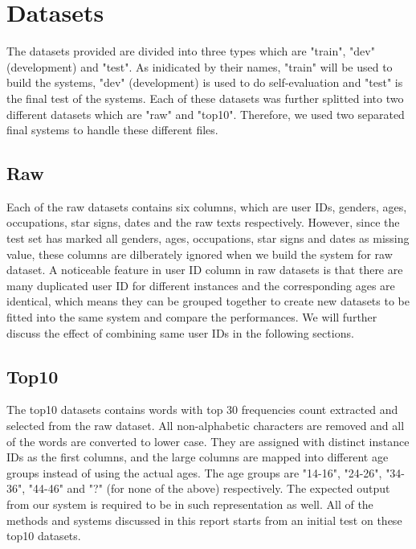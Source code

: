 \documentclass[10pt]{article}
\begin{document}
\section{Datasets}
\justify

The datasets \cite{dataset} provided are divided into three types which are "train", "dev" (development) and "test". As inidicated by their names, "train" will be used to build the systems, "dev" (development) is used to do self-evaluation and "test" is the final test of the systems. Each of these datasets was further splitted into two different datasets which are "raw" and "top10". Therefore, we used two separated final systems to handle these different files.

\subsection{Raw}
\justify

Each of the raw datasets contains six columns, which are user IDs, genders, ages, occupations, star signs, dates and the raw texts respectively. However, since the test set has marked all genders, ages, occupations, star signs and dates as missing value, these columns are dilberately ignored when we build the system for raw dataset. A noticeable feature in user ID column in raw datasets is that there are many duplicated user ID for different instances and the corresponding ages are identical, which means they can be grouped together to create new datasets to be fitted into the same system and compare the performances. We will further discuss the effect of combining same user IDs in the following sections.

\subsection{Top10}
\justify

The top10 datasets contains words with top 30 frequencies count extracted and selected from the raw dataset. All non-alphabetic characters are removed and all of the words are converted to lower case. They are assigned with distinct instance IDs as the first columns, and the large columns are mapped into different age groups instead of using the actual ages. The age groups are "14-16", "24-26", "34-36", "44-46" and "?" (for none of the above) respectively. The expected output from our system is required to be in such representation as well. All of the methods and systems discussed in this report starts from an initial test on these top10 datasets.
\end{document}
